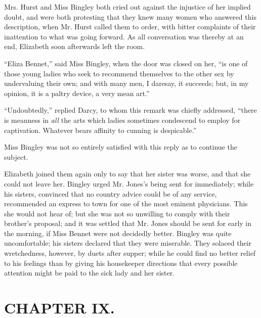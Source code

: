 Mrs. Hurst and Miss Bingley both cried out against the injustice of her implied doubt, and were both protesting that they knew many women who answered this description, when Mr. Hurst called them to order, with bitter complaints of their inattention to what was going forward. As all conversation was thereby at an end, Elizabeth soon afterwards left the room.

``Eliza Bennet,'' said Miss Bingley, when the door was closed on her, ``is one of those young ladies who seek to recommend themselves to the other sex by undervaluing their own; and with many men, I daresay, it succeeds; but, in my opinion, it is a paltry device, a very mean art.''

``Undoubtedly,'' replied Darcy, to whom this remark was chiefly addressed, ``there is meanness in \textit{all} the arts which ladies sometimes condescend to employ for captivation. Whatever bears affinity to cunning is despicable.''

Miss Bingley was not so entirely satisfied with this reply as to continue the subject.

Elizabeth joined them again only to say that her sister was worse, and that she could not leave her. Bingley urged Mr. Jones's being sent for immediately; while his sisters, convinced that no country advice could be of any service, recommended an express to town for one of the most eminent physicians. This she would not hear of; but she was not so unwilling to comply with their brother's proposal; and it was settled that Mr. Jones should be sent for early in the morning, if Miss Bennet were not decidedly better. Bingley was quite uncomfortable; his sisters declared that they were miserable. They solaced their wretchedness, however, by duets after supper; while he could find no better relief to his feelings than by giving his housekeeper directions that every possible attention might be paid to the sick lady and her sister.


\chapter{CHAPTER IX.}

